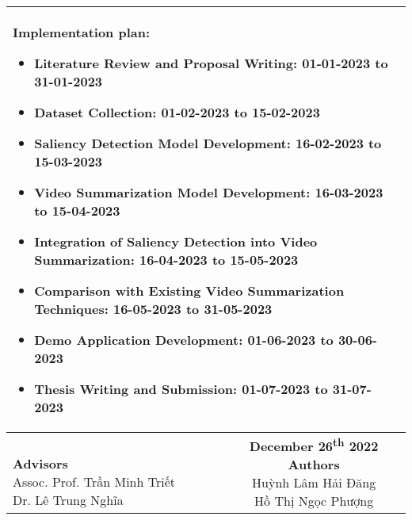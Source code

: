 \begin{longtable}{|l|c|}
\multicolumn{2}{|m{\linewidth}|}{
\textbf{Implementation plan}:
\begin{itemize}
  \item Literature Review and Proposal Writing: 01-01-2023 to 31-01-2023
  \item Dataset Collection: 01-02-2023 to 15-02-2023
  \item Saliency Detection Model Development: 16-02-2023 to 15-03-2023
  \item Video Summarization Model Development: 16-03-2023 to 15-04-2023
  \item Integration of Saliency Detection into Video Summarization: 16-04-2023 to 15-05-2023
  \item Comparison with Existing Video Summarization Techniques: 16-05-2023 to 31-05-2023
  \item Demo Application Development: 01-06-2023 to 30-06-2023
  \item Thesis Writing and Submission: 01-07-2023 to 31-07-2023
\end{itemize}}\\
\hline
\makecell{\\ \textbf{Advisors} \vspace*{2cm} \\ Assoc. Prof. Trần Minh Triết \vspace*{2cm} \\ Dr. Lê Trung Nghĩa} & \makecell{\textbf{December 26\textsuperscript{th} 2022}\\ \textbf{Authors} \vspace*{2cm} \\ Huỳnh Lâm Hải Đăng \vspace*{2cm} \\ Hồ Thị Ngọc Phượng}\\
\hline
\end{longtable}

